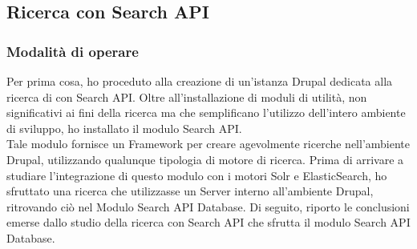 		\subsection{Ricerca con Search API}
		
			\subsubsection{Modalità di operare}
			Per prima cosa, ho proceduto alla creazione di un'istanza \gls{Drupal} dedicata alla ricerca di con \gls{Search API}.
			Oltre all'installazione di moduli di utilità, non significativi ai fini della ricerca ma che semplificano l'utilizzo dell'intero ambiente di sviluppo, ho installato il modulo \gls{Search API}. \\
			Tale modulo fornisce un \gls{Framework} per creare agevolmente ricerche nell'ambiente \gls{Drupal}, utilizzando qualunque tipologia di motore di ricerca. Prima di arrivare a studiare l'integrazione di questo modulo con i motori \gls{Solr} e \gls{ElasticSearch}, ho sfruttato una ricerca che utilizzasse un \gls{Server} interno all'ambiente \gls{Drupal}, ritrovando ciò nel \gls{Modulo} \gls{Search API Database}.
			Di seguito, riporto le conclusioni emerse dallo studio della ricerca con \gls{Search API} che sfrutta il modulo \gls{Search API Database}.
			
